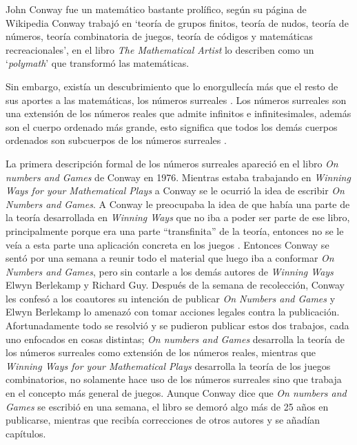 John Conway fue un matem\'atico bastante prol\'ifico, seg\'un su p\'agina de Wikipedia \cite{wiki:John_Horton_Conway} Conway trabaj\'o en `teor\'ia de grupos finitos, teor\'ia de nudos, teor\'ia de n\'umeros, teor\'ia combinatoria de juegos, teor\'ia de c\'odigos y matem\'aticas recreacionales', en el libro \textit{The Mathematical Artist} \cite{MathematicalArtist2022} lo describen como un `\textit{polymath}' que transform\'o las matem\'aticas.

Sin embargo, exist\'ia un descubrimiento que lo enorgullec\'ia m\'as que el resto de sus aportes a las matem\'aticas, los n\'umeros surreales \cite{YTNumberphileConway}. Los n\'umeros surreales son una extensi\'on de los n\'umeros reales que admite infinitos e infinitesimales, adem\'as son el cuerpo ordenado m\'as grande, esto significa que todos los dem\'as cuerpos ordenados son subcuerpos de los n\'umeros surreales \cite{Bajnok2013}.

La primera descripci\'on formal de los n\'umeros surreales apareci\'o en el libro \textit{On numbers and Games} de Conway en 1976. Mientras estaba trabajando en \textit{Winning Ways for your Mathematical Plays} a Conway se le ocurri\'o la idea de escribir \textit{On Numbers and Games}. A Conway le preocupaba la idea de que hab\'ia una parte de la teor\'ia desarrollada en \textit{Winning Ways} que no iba a poder ser parte de ese libro, principalmente porque era una parte ``transfinita'' de la teor\'ia, entonces no se le ve\'ia a esta parte una aplicaci\'on concreta en los juegos \cite{Conway2000}. Entonces Conway se sent\'o por una semana a reunir todo el material que luego iba a conformar \textit{On Numbers and Games}, pero sin contarle a los dem\'as autores de \textit{Winning Ways} Elwyn Berlekamp y Richard Guy. Despu\'es de la semana de recolecci\'on, Conway les confes\'o a los coautores su intenci\'on de publicar \textit{On Numbers and Games} y Elwyn Berlekamp lo amenaz\'o con tomar acciones legales contra la publicaci\'on. Afortunadamente todo se resolvi\'o y se pudieron publicar estos dos trabajos, cada uno enfocados en cosas distintas; \textit{On numbers and Games} desarrolla la teor\'ia de los n\'umeros surreales como extensi\'on de los n\'umeros reales, mientras que \textit{Winning Ways for your Mathematical Plays} desarrolla la teor\'ia de los juegos combinatorios, no solamente hace uso de los n\'umeros surreales sino que trabaja en el concepto m\'as general de juegos. Aunque Conway dice que \textit{On numbers and Games} se escribi\'o en una semana, el libro se demor\'o algo m\'as de 25 a\~nos en publicarse, mientras que recib\'ia correcciones de otros autores y se a\~nad\'ian cap\'itulos.

